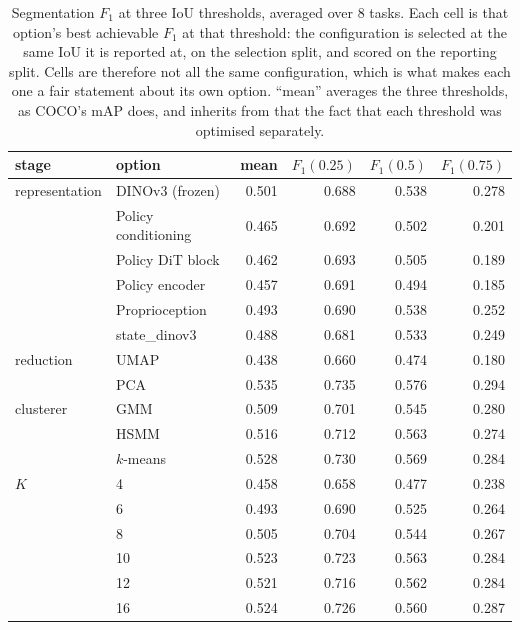 \begin{table}[t]
\centering\small
\begin{tabular}{@{}ll r@{\hskip 1.2em}r r r@{}}
\toprule
stage & option & mean & $F_1(0.25)$ & $F_1(0.5)$ & $F_1(0.75)$ \\
\midrule
representation & DINOv3 (frozen) & 0.501 & 0.688 & 0.538 & 0.278 \\
 & Policy conditioning & 0.465 & 0.692 & 0.502 & 0.201 \\
 & Policy DiT block & 0.462 & 0.693 & 0.505 & 0.189 \\
 & Policy encoder & 0.457 & 0.691 & 0.494 & 0.185 \\
 & Proprioception & 0.493 & 0.690 & 0.538 & 0.252 \\
 & state_dinov3 & 0.488 & 0.681 & 0.533 & 0.249 \\
reduction & UMAP & 0.438 & 0.660 & 0.474 & 0.180 \\
 & PCA & 0.535 & 0.735 & 0.576 & 0.294 \\
clusterer & GMM & 0.509 & 0.701 & 0.545 & 0.280 \\
 & HSMM & 0.516 & 0.712 & 0.563 & 0.274 \\
 & $k$-means & 0.528 & 0.730 & 0.569 & 0.284 \\
$K$ & 4 & 0.458 & 0.658 & 0.477 & 0.238 \\
 & 6 & 0.493 & 0.690 & 0.525 & 0.264 \\
 & 8 & 0.505 & 0.704 & 0.544 & 0.267 \\
 & 10 & 0.523 & 0.723 & 0.563 & 0.284 \\
 & 12 & 0.521 & 0.716 & 0.562 & 0.284 \\
 & 16 & 0.524 & 0.726 & 0.560 & 0.287 \\
\bottomrule
\end{tabular}
\caption{Segmentation $F_1$ at three IoU thresholds, averaged over 8 tasks. Each cell is that option's best achievable $F_1$ at that threshold: the configuration is selected at the same IoU it is reported at, on the selection split, and scored on the reporting split. Cells are therefore not all the same configuration, which is what makes each one a fair statement about its own option. ``mean'' averages the three thresholds, as COCO's mAP does, and inherits from that the fact that each threshold was optimised separately.}
\label{tab:ablation-strictness}
\end{table}
